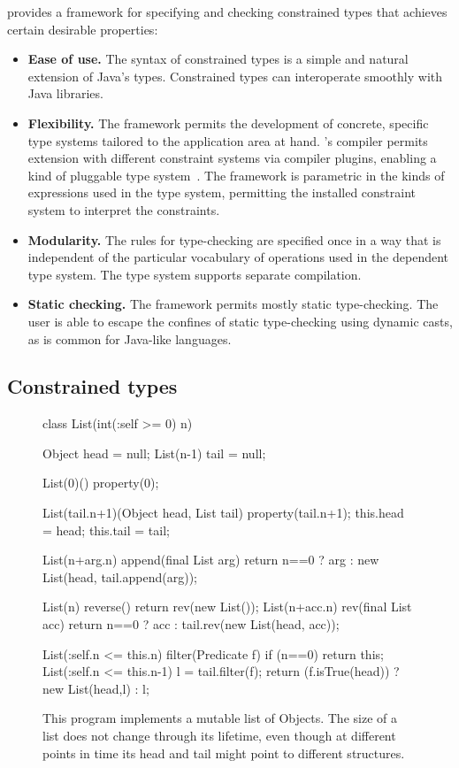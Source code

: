 \Xten{} provides a framework for specifying and checking constrained types
that achieves certain desirable properties:
\begin{itemize}
\item 
{\bf Ease of use.}  
The syntax of constrained types is a simple and
natural extension of Java's types.  Constrained types can
interoperate smoothly with Java libraries.

\item
{\bf Flexibility.}
The framework
permits the development of concrete,
specific type systems tailored to the application area at
hand.  \Xten{}'s compiler permits extension with different constraint systems
via compiler plugins, enabling a kind of pluggable type system~\cite{bracha04-pluggable}.
The framework is parametric in the kinds of
expressions used in the type system, permitting the installed constraint
system to interpret the constraints.

\item
{\bf Modularity.}
The rules for type-checking
are specified once in a way that is independent of the
particular vocabulary of operations used in the dependent type
system.
The type system supports separate compilation.

\item
{\bf Static checking.}  The framework permits mostly static
type-checking. The user is able to escape the confines of
static type-checking using dynamic casts, as is common for Java-like
languages.
\end{itemize}

\subsection{Constrained types}

\begin{figure}[t]
{
\small
\begin{xtennoindent}
class List(int(:self >= 0) n) {
  Object head = null;
  List(n-1) tail = null;

  List(0)() { property(0); }

  List(tail.n+1)(Object head, List tail) {
    property(tail.n+1);
    this.head = head;
    this.tail = tail;
  }

  List(n+arg.n) append(final List arg) {
    return n==0
      ? arg : new List(head, tail.append(arg));
  }

  List(n) reverse() { return rev(new List()); }
  List(n+acc.n) rev(final List acc) {
    return n==0
      ? acc : tail.rev(new List(head, acc));
  }

  List(:self.n <= this.n) filter(Predicate f) {
    if (n==0) return this;
    List(:self.n <= this.n-1) l = tail.filter(f);
    return (f.isTrue(head)) ? new List(head,l) : l;
  }
}
\end{xtennoindent}
}
\caption{
This program implements a mutable list of Objects. The size of a list
does not change through its lifetime, even though at different points
in time its head and tail might point to different structures.}
\label{fig:list-example}
\end{figure}

